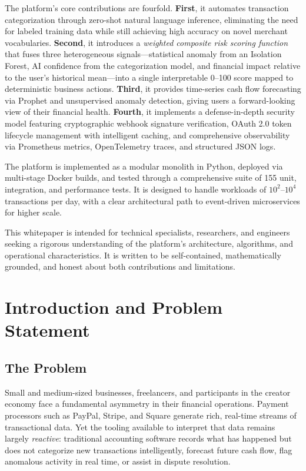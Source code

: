 \documentclass[11pt,a4paper]{article}
\begin{document}
The platform's core contributions are fourfold. \textbf{First}, it automates transaction categorization through zero-shot natural language inference, eliminating the need for labeled training data while still achieving high accuracy on novel merchant vocabularies. \textbf{Second}, it introduces a \emph{weighted composite risk scoring function} that fuses three heterogeneous signals---statistical anomaly from an Isolation Forest, AI confidence from the categorization model, and financial impact relative to the user's historical mean---into a single interpretable 0--100 score mapped to deterministic business actions. \textbf{Third}, it provides time-series cash flow forecasting via Prophet and unsupervised anomaly detection, giving users a forward-looking view of their financial health. \textbf{Fourth}, it implements a defense-in-depth security model featuring cryptographic webhook signature verification, OAuth 2.0 token lifecycle management with intelligent caching, and comprehensive observability via Prometheus metrics, OpenTelemetry traces, and structured JSON logs.

The platform is implemented as a modular monolith in Python, deployed via multi-stage Docker builds, and tested through a comprehensive suite of 155 unit, integration, and performance tests. It is designed to handle workloads of $10^2$--$10^4$ transactions per day, with a clear architectural path to event-driven microservices for higher scale.

This whitepaper is intended for technical specialists, researchers, and engineers seeking a rigorous understanding of the platform's architecture, algorithms, and operational characteristics. It is written to be self-contained, mathematically grounded, and honest about both contributions and limitations.


\section{Introduction and Problem Statement}
\label{sec:introduction}

\subsection{The Problem}

Small and medium-sized businesses, freelancers, and participants in the creator economy face a fundamental asymmetry in their financial operations. Payment processors such as PayPal, Stripe, and Square generate rich, real-time streams of transactional data. Yet the tooling available to interpret that data remains largely \emph{reactive}: traditional accounting software records what has happened but does not categorize new transactions intelligently, forecast future cash flow, flag anomalous activity in real time, or assist in dispute resolution.
\end{document}
